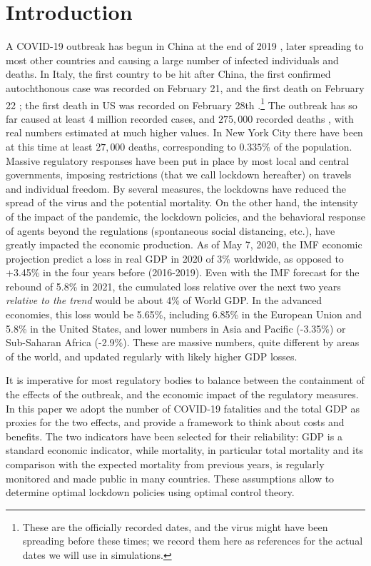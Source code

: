 \documentclass{amsart}
\begin{document}
\tableofcontents

\newpage

\section{Introduction}

A COVID-19 outbreak has begun in China at the end of 2019
\cite{HWO}, later spreading  to most other countries and causing 
a large number of infected individuals and deaths. In Italy, the first
country to be hit after China, the first confirmed
autochthonous case was recorded on February 21, and the first death on February 22 \cite{Stat2020};
the first death in US was recorded on February 28th \cite{NYT}.\footnote{These are the officially recorded dates, and the virus
might have been spreading before these times; we
record them here as references for the actual dates
we will use in simulations.}
The outbreak has so far caused at least $4$ million recorded
cases, and $275,000$ recorded deaths \cite{WM},
with real numbers estimated at much higher values.
In New York City there have been at this time at least 
$27,000$ deaths, corresponding to $0.335\%$ of the 
population. Massive regulatory responses have been put in place by most local and central governments, imposing restrictions (that we call lockdown hereafter) on travels and individual freedom. By several measures, the lockdowns have reduced the
spread of the virus and  the potential mortality.
On the other hand, the intensity of the impact of the pandemic, the lockdown policies, and  the behavioral response of agents beyond the regulations (spontaneous social distancing, etc.),
have greatly impacted the economic production. As of May 7, 2020, the IMF economic projection predict a loss in real GDP in 2020 of 3\% worldwide, as opposed to +3.45\% in the four years before (2016-2019). Even with the IMF forecast for the rebound of 5.8\% in 2021, the cumulated loss relative over the next two years \textit{relative to the trend} would be about 4\% of World GDP. In the advanced economies, this loss would be 5.65\%, including 6.85\% in the European Union and 5.8\% in the United States, and lower numbers in Asia and Pacific (-3.35\%) or Sub-Saharan Africa (-2.9\%). These are massive numbers, quite different by areas of the world, and updated regularly with likely higher GDP losses.


It is imperative for most regulatory bodies to balance
between the containment of the effects of the outbreak, and
the economic impact of the regulatory measures.
In this paper we adopt the number of COVID-19 fatalities
and the total GDP as proxies for the two effects,
and provide a framework to think about costs and benefits.
The two indicators
 have been selected for their reliability:
 GDP is a standard economic indicator,
 while mortality, in particular total mortality
 and its comparison with the expected mortality from
 previous years, is regularly monitored and 
 made public in many countries.
These assumptions allow to determine optimal lockdown policies
using optimal control theory.
\end{document}
